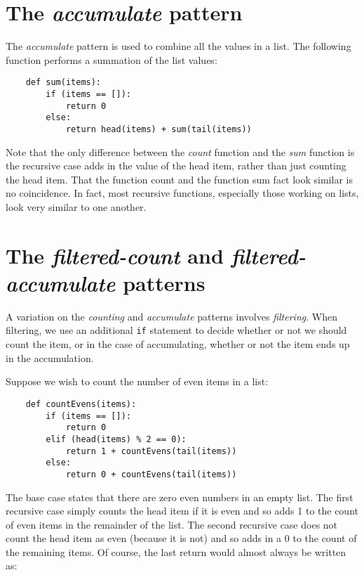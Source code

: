 \section{The {\it accumulate} pattern}

The {\it accumulate} pattern is used to combine all the values in
a list.
The following function performs a summation of the list values:

\begin{verbatim}
    def sum(items):
        if (items == []):
            return 0
        else:
            return head(items) + sum(tail(items))
\end{verbatim}

Note that the only difference between the {\it count} function and
the {\it sum} function is the recursive case adds in the value of
the head item, rather than just counting the head item.
That the function count and the function sum fact look similar
is no coincidence. In fact, most recursive functions, especially
those working on lists, look very
similar to one another.

\section{The {\it filtered-count} and {\it filtered-accumulate} patterns}

A variation on the {\it counting} and {\it accumulate} 
patterns involves {\it filtering}. When filtering,
we use an additional \verb!if! statement to decide whether 
or not we should count the item, or in the case of accumulating,
whether or not the item ends up in the accumulation.

Suppose we wish to count the number of even items in
a list:

\begin{verbatim}
    def countEvens(items):
        if (items == []):
            return 0
        elif (head(items) % 2 == 0):
            return 1 + countEvens(tail(items))
        else:
            return 0 + countEvens(tail(items))
\end{verbatim}

The base case states that there are zero even numbers
in an empty list.
The first recursive case simply counts the head item if
it is even and so adds 1 to the count of even items in
the remainder of the list. The second recursive case
does not count the head item as even (because it is not)
and so adds in a 0 to the count of the remaining items.
Of course, the last return would almost always be written
as:


